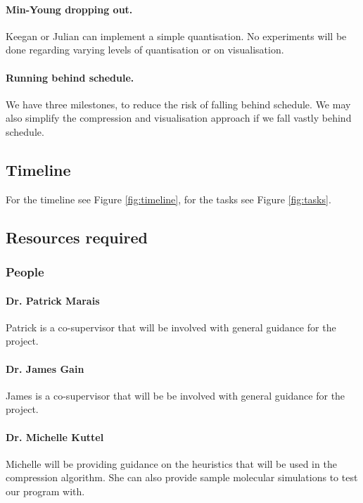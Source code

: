 \documentclass[a4paper,twocolumn]{article}
\begin{document}
\paragraph{Min-Young dropping out.} Keegan or Julian can implement a simple
quantisation. No experiments will be done regarding varying levels of
quantisation or on visualisation.

\paragraph{Running behind schedule.} We have three milestones, to reduce the risk
of falling behind schedule. We may also simplify the compression and
visualisation approach if we fall vastly behind schedule.

\subsection{Timeline}

For the timeline see Figure \ref{fig:timeline}, for the tasks see Figure \ref{fig:tasks}.

\subsection{Resources required}

\subsubsection{People}

\paragraph{Dr. Patrick Marais} Patrick is a co-supervisor that will be involved
with general guidance for the project.

\paragraph{Dr. James Gain} James is a co-supervisor that will be be involved
with general guidance for the project.

\paragraph{Dr. Michelle Kuttel} Michelle will be providing guidance on the
heuristics that will be used in the compression algorithm. She can also provide sample molecular simulations to test our program with.
\end{document}
